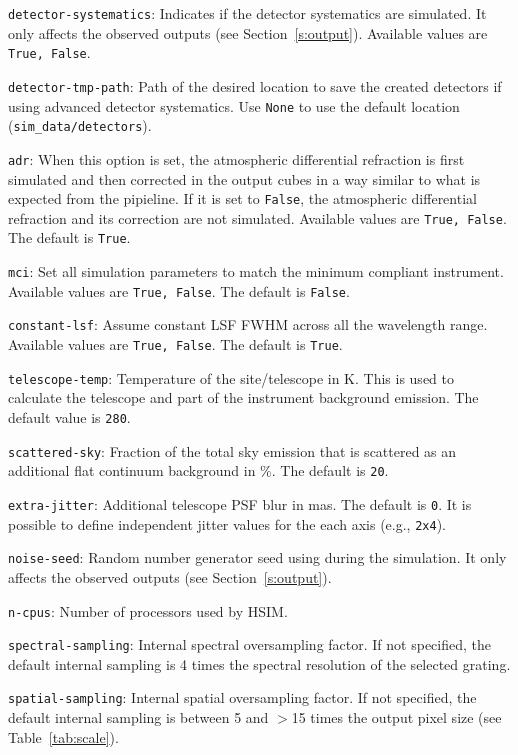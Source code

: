 \documentclass[12pt]{report}
\begin{document}
\begin{description}
\item \texttt{detector-systematics}: Indicates if the detector systematics are simulated. It only affects the observed outputs (see Section~\ref{s:output}). Available values are \texttt{True, False}.

\item \texttt{detector-tmp-path}: Path of the desired location to save the created detectors if using advanced detector systematics. Use \texttt{None} to use the default location (\texttt{sim\_data/detectors}).

\item \texttt{adr}: When this option is set, the atmospheric differential refraction is first simulated and then corrected in the output cubes in a way similar to what is expected from the pipieline. If it is set to \texttt{False}, the atmospheric differential refraction and its correction are not simulated. Available values are \texttt{True, False}. The default is \texttt{True}.

\item \texttt{mci}: Set all simulation parameters to match the minimum compliant instrument. Available values are \texttt{True, False}. The default is \texttt{False}.

\item \texttt{constant-lsf}: Assume constant LSF FWHM across all the wavelength range. Available values are \texttt{True, False}. The default is \texttt{True}.

\item \texttt{telescope-temp}: Temperature of the site\slash telescope in K. This is used to calculate the telescope and part of the instrument background emission. The default value is \texttt{280}.

\item \texttt{scattered-sky}: Fraction of the total sky emission that is scattered as an additional flat continuum background in \%. The default is \texttt{20}.

\item \texttt{extra-jitter}: Additional telescope PSF blur in mas. The default is \texttt{0}. It is possible to define independent jitter values for the each axis (e.g., \texttt{2x4}).

\item \texttt{noise-seed}: Random number generator seed using during the simulation. It only affects the observed outputs (see Section~\ref{s:output}).

\item \texttt{n-cpus}: Number of processors used by HSIM.

\item \texttt{spectral-sampling}: Internal spectral oversampling factor. If not specified, the default internal sampling is 4 times the spectral resolution of the selected grating.

\item \texttt{spatial-sampling}: Internal spatial oversampling factor. If not specified, the default internal sampling is between 5 and $>$15 times the output pixel size (see Table~\ref{tab:scale}).

\end{description}
\end{document}
